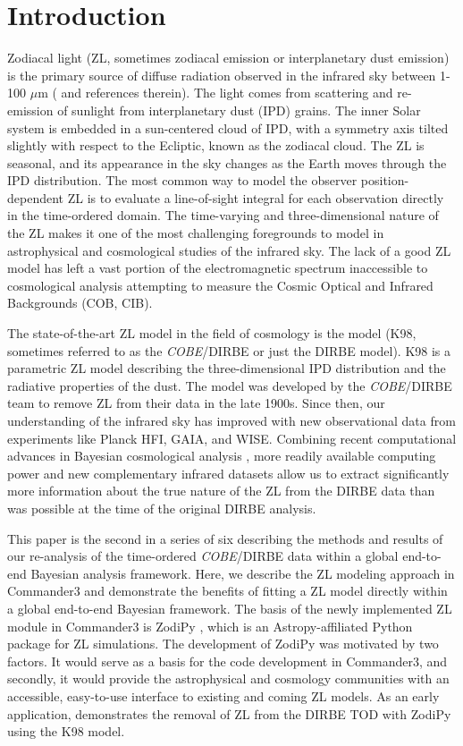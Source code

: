 \documentclass{aa}
\begin{document}
\setcounter{tocdepth}{3}
   

\section{Introduction}
Zodiacal light (ZL, sometimes zodiacal emission or interplanetary dust 
emission) is the primary source of diffuse radiation observed in the 
infrared sky between 1-100 $\mu$m (\cite{Leinert1998} and references 
therein). The light comes from scattering and re-emission of sunlight 
from interplanetary dust (IPD) grains. The inner Solar system is 
embedded in a sun-centered cloud of IPD, with a symmetry axis tilted 
slightly with respect to the Ecliptic, known as the zodiacal cloud. The 
ZL is seasonal, and its appearance in the sky changes as the Earth moves 
through the IPD distribution. The most common way to model the observer 
position-dependent ZL is to evaluate a line-of-sight integral for each 
observation directly in the time-ordered domain. The time-varying and 
three-dimensional nature of the ZL makes it one of the most challenging 
foregrounds to model in astrophysical and cosmological studies of the 
infrared sky. The lack of a good ZL model has left a vast portion of the 
electromagnetic spectrum inaccessible to cosmological analysis 
attempting to measure the Cosmic Optical and Infrared Backgrounds (COB, 
CIB). 

The state-of-the-art ZL model in the field of cosmology is the 
\cite{Kelsall1998} model (K98, sometimes referred to as the 
\textit{COBE}/DIRBE or just the DIRBE model). K98 is a parametric ZL 
model describing the three-dimensional IPD distribution and the 
radiative properties of the dust. The model was developed by the 
\textit{COBE}/DIRBE team to remove ZL from their data in the late 1900s.
 Since then, our understanding of the infrared sky has improved with new 
 observational data from experiments like Planck HFI, GAIA, and WISE. 
 Combining recent computational advances in Bayesian cosmological 
 analysis \citep{BP2023, Galloway2023, Watts2023}, more readily 
 available computing power and new complementary infrared datasets 
 allow us to extract significantly more information about the true 
 nature of the ZL from the DIRBE data than was possible at the time 
 of the original DIRBE analysis.

This paper is the second in a series of six describing the methods and 
results of our re-analysis of the time-ordered \textit{COBE}/DIRBE data 
within a global end-to-end Bayesian analysis framework. Here, we 
describe the ZL modeling approach in Commander3 and demonstrate the 
benefits of fitting a ZL model directly within a global end-to-end 
Bayesian framework. The basis of the newly implemented ZL module in 
Commander3 is ZodiPy \citep{San2024}, which is an Astropy-affiliated 
Python package for ZL simulations. The development of ZodiPy was 
motivated by two factors. It would serve as a basis for the code 
development in Commander3, and secondly, it would provide the 
astrophysical and cosmology communities with an accessible, easy-to-use 
interface to existing and coming ZL models. As an early application, 
\cite{San2022} demonstrates the removal of ZL from the DIRBE TOD with 
ZodiPy using the K98 model.
\end{document}
